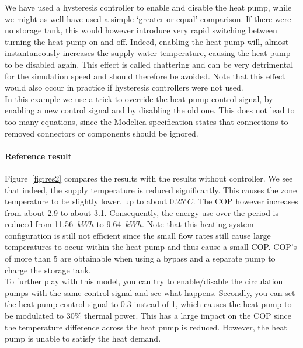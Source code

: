 \documentclass[10pt,a4paper]{article}
\begin{document}
We have used a hysteresis controller to enable and disable the heat pump,
while we might as well have used a simple `greater or equal' comparison.
If there were no storage tank,
this would however introduce very rapid switching between turning the heat pump on
and off. Indeed, enabling the heat pump will, almost instantaneously increases the 
supply water temperature, causing the heat pump to be disabled again.
This effect is called chattering and can be very detrimental for the simulation speed 
and should therefore be avoided.
Note that this effect would also occur in practice if hysteresis controllers were not used.\\

In this example we use a trick to override the heat pump control signal, by enabling a new
control signal and by disabling the old one. This does not lead
to too many equations, since the Modelica specification states that 
connections to removed connectors or components should be ignored.


\paragraph{Reference result}
Figure~\ref{fig:res2} compares the results with the results without controller.
We see that indeed, the supply temperature is reduced significantly.
This causes the zone temperature to be slightly lower, up to about 0.25$^{\circ}C$.
The COP however increases from about 2.9 to about 3.1.
Consequently, the energy use over the period is reduced from 11.56~$kWh$
to 9.64~$kWh$. Note that this heating system configuration is still 
not efficient since the small flow rates still cause 
large temperatures to occur within the heat pump
and thus cause a small COP.
COP's of more than 5 are obtainable when using a bypass and a separate
pump to charge the storage tank.\\


To further play with this model, you can try to enable/disable the circulation pumps with the same control
signal and see what happens.
Secondly, you can set the heat pump control signal to 0.3 instead of 1,
which causes the heat pump to be modulated to 30\% thermal power.
This has a large impact on the COP since the temperature difference across the heat 
pump is reduced. 
However, the heat pump is unable to satisfy the heat demand.\\
\end{document}
